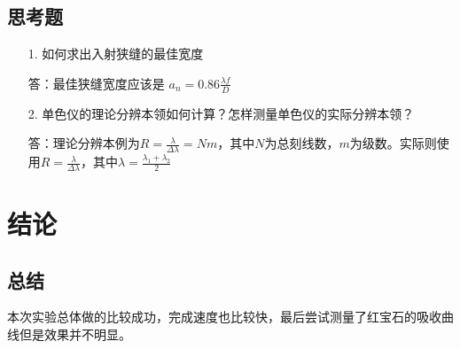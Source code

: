 \documentclass[utf8]{ctexart}
\begin{document}
		\subsection*{思考题}
	\begin{itemize}
		\item [1.] 如何求出入射狭缝的最佳宽度
		\item [ ]答：最佳狭缝宽度应该是 $a_n = 0.86\frac{\lambda f}{D}$
		\item [2.]单色仪的理论分辨本领如何计算？怎样测量单色仪的实际分辨本领？
		\item [ ]答：理论分辨本例为$R = \frac{\lambda}{\Delta\lambda} = Nm$，其中$N$为总刻线数，$m$为级数。实际则使用$R = \frac{\lambda}{\Delta\lambda}$，其中$\lambda = \frac{\lambda_1+\lambda_2}{2}$
	\end{itemize}
	
	\section*{结论}
	\subsection*{总结}
	本次实验总体做的比较成功，完成速度也比较快，最后尝试测量了红宝石的吸收曲线但是效果并不明显。
	
	
	
	
	
	\label{unknown}
\end{document}
